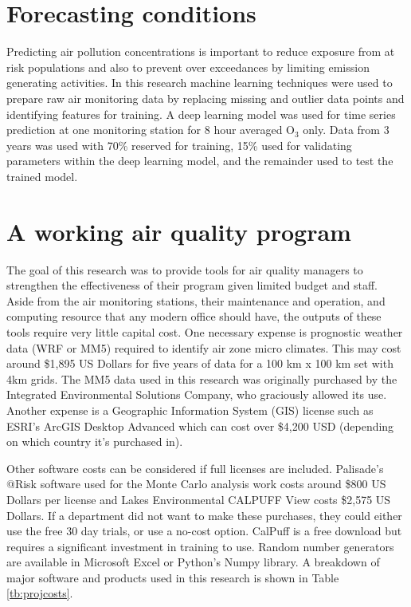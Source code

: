 \section{Forecasting conditions}

Predicting air pollution concentrations is important to reduce exposure from at risk populations and also to prevent over exceedances by limiting emission generating activities. In this research machine learning techniques were used to prepare raw air monitoring data by replacing missing and outlier data points and identifying features for training. A deep learning model was used for time series prediction at one monitoring station for 8 hour averaged O$_{3}$ only.  Data from 3 years was used with 70\% reserved for training, 15\% used for validating parameters within the deep learning model, and the remainder used to test the trained model.

\section{A working air quality program}

The goal of this research was to provide tools for air quality managers to strengthen the effectiveness of their program given limited budget and staff. Aside from the air monitoring stations, their maintenance and operation, and computing resource that any modern office should have, the outputs of these tools require very little capital cost. One necessary expense is prognostic weather data (WRF or MM5) required to identify air zone micro climates. This may cost around \$1,895 US Dollars for five years of data for a 100 km x 100 km set with 4km grids. The MM5 data used in this research was originally purchased by the Integrated Environmental Solutions Company, who graciously allowed its use. Another expense is a Geographic Information System (GIS) license such as ESRI's ArcGIS Desktop Advanced which can cost over \$4,200 USD (depending on which country it's purchased in).

Other software costs can be considered if full licenses are included. Palisade's @Risk software used for the Monte Carlo analysis work costs around \$800 US Dollars per license and Lakes Environmental CALPUFF View costs \$2,575 US Dollars. If a department did not want to make these purchases, they could either use the free 30 day trials, or use a no-cost option. CalPuff is a free download but requires a significant investment in training to use. Random number generators are available in Microsoft Excel or Python's Numpy library. A breakdown of major software and products used in this research is shown in Table \ref{tb:projcosts}.

